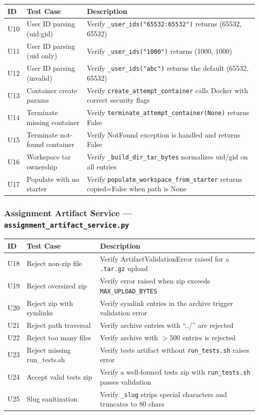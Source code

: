 \documentclass[12pt, letterpaper]{article}
\begin{document}
\begin{longtable}{p{0.5cm} p{4.5cm} p{8.5cm}}
    \toprule
    \textbf{ID} & \textbf{Test Case} & \textbf{Description} \\
    \midrule
    U10 & User ID parsing (uid:gid) & Verify \texttt{\_user\_ids("65532:65532")} returns (65532, 65532) \\
    U11 & User ID parsing (uid only) & Verify \texttt{\_user\_ids("1000")} returns (1000, 1000) \\
    U12 & User ID parsing (invalid) & Verify \texttt{\_user\_ids("abc")} returns the default (65532, 65532) \\
    U13 & Container create params & Verify \texttt{create\_attempt\_container} calls Docker with correct security flags \\
    U14 & Terminate missing container & Verify \texttt{terminate\_attempt\_container(None)} returns False \\
    U15 & Terminate not-found container & Verify NotFound exception is handled and returns False \\
    U16 & Workspace tar ownership & Verify \texttt{\_build\_dir\_tar\_bytes} normalizes uid/gid on all entries \\
    U17 & Populate with no starter & Verify \texttt{populate\_workspace\_from\_starter} returns copied=False when path is None \\
    \bottomrule
\end{longtable}

\subsubsection{Assignment Artifact Service --- \texttt{assignment\_artifact\_service.py}}

\begin{longtable}{p{0.5cm} p{4.5cm} p{8.5cm}}
    \toprule
    \textbf{ID} & \textbf{Test Case} & \textbf{Description} \\
    \midrule
    U18 & Reject non-zip file & Verify ArtifactValidationError raised for a \texttt{.tar.gz} upload \\
    U19 & Reject oversized zip & Verify error raised when zip exceeds \texttt{MAX\_UPLOAD\_BYTES} \\
    U20 & Reject zip with symlinks & Verify symlink entries in the archive trigger validation error \\
    U21 & Reject path traversal & Verify archive entries with ``../'' are rejected \\
    U22 & Reject too many files & Verify archive with $>$500 entries is rejected \\
    U23 & Reject missing run\_tests.sh & Verify tests artifact without \texttt{run\_tests.sh} raises error \\
    U24 & Accept valid tests zip & Verify a well-formed tests zip with \texttt{run\_tests.sh} passes validation \\
    U25 & Slug sanitization & Verify \texttt{\_slug} strips special characters and truncates to 80 chars \\
    \bottomrule
\end{longtable}
\end{document}
